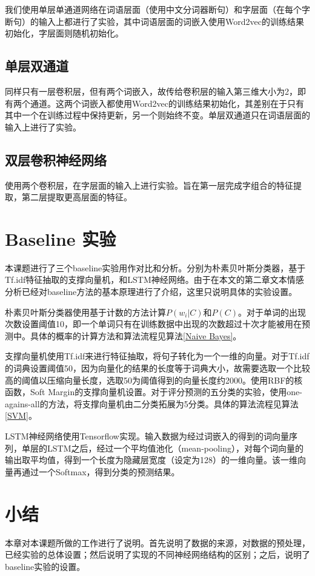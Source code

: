 我们使用单层单通道网络在词语层面（使用中文分词器断句）和字层面（在每个字断句）的输入上都进行了实验，其中词语层面的词嵌入使用Word2vec的训练结果初始化，字层面则随机初始化。

\subsection{单层双通道}
同样只有一层卷积层，但有两个词嵌入，故传给卷积层的输入第三维大小为2，即有两个通道。这两个词嵌入都使用Word2vec的训练结果初始化，其差别在于只有其中一个在训练过程中保持更新，另一个则始终不变。单层双通道只在词语层面的输入上进行了实验。

\subsection{双层卷积神经网络}
使用两个卷积层，在字层面的输入上进行实验。旨在第一层完成字组合的特征提取，第二层提取更高层面的特征。

\section{Baseline 实验}
本课题进行了三个baseline实验用作对比和分析。分别为朴素贝叶斯分类器，基于Tf.idf特征抽取的支撑向量机，和LSTM神经网络。由于在本文的第二章文本情感分析已经对baseline方法的基本原理进行了介绍，这里只说明具体的实验设置。

朴素贝叶斯分类器使用基于计数的方法计算$P(w_i|C)$和$P(C)$。对于单词的出现次数设置阈值10，即一个单词只有在训练数据中出现的次数超过十次才能被用在预测中。具体的概率的计算方法和算法流程见算法\ref{Naive Bayes}。

支撑向量机使用Tf.idf来进行特征抽取，将句子转化为一个一维的向量。对于Tf.idf的词典设置阈值50，因为向量化的结果的长度等于词典大小，故需要选取一个比较高的阈值以压缩向量长度，选取50为阈值得到的向量长度约2000。使用RBF的核函数，Soft Margin的支撑向量机设置。对于评分预测的五分类的实验，使用one-agains-all的方法，将支撑向量机由二分类拓展为5分类。具体的算法流程见算法\ref{SVM}。

LSTM神经网络使用Tensorflow实现。输入数据为经过词嵌入的得到的词向量序列，单层的LSTM之后，经过一个平均值池化（mean-pooling），对每个词向量的输出取平均值，得到一个长度为隐藏层宽度（设定为128）的一维向量。该一维向量再通过一个Softmax，得到分类的预测结果。

\section{小结}
本章对本课题所做的工作进行了说明。首先说明了数据的来源，对数据的预处理，已经实验的总体设置；然后说明了实现的不同神经网络结构的区别；之后，说明了baseline实验的设置。
